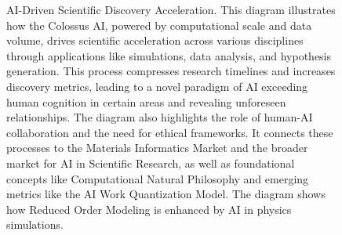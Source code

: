\documentclass[fontsize=10pt, oneside, DIV=calc]{scrartcl}
\begin{document}
\begin{figure}[H]
  \centering
  \noindent
  \begin{minipage}{\textwidth}
    \centering
    \caption{AI-Driven Scientific Discovery Acceleration. This diagram illustrates how the Colossus AI, powered by computational scale and data volume, drives scientific acceleration across various disciplines through applications like simulations, data analysis, and hypothesis generation. This process compresses research timelines and increases discovery metrics, leading to a novel paradigm of AI exceeding human cognition in certain areas and revealing unforeseen relationships. The diagram also highlights the role of human-AI collaboration and the need for ethical frameworks. It connects these processes to the Materials Informatics Market and the broader market for AI in Scientific Research, as well as foundational concepts like Computational Natural Philosophy and emerging metrics like the AI Work Quantization Model. The diagram shows how Reduced Order Modeling is enhanced by AI in physics simulations.}
  \end{minipage}
\end{figure}
\end{document}
